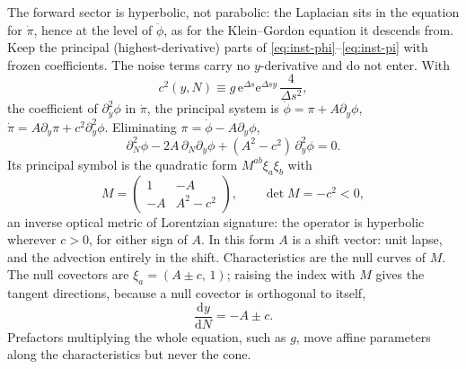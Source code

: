 \documentclass[a4paper,11pt]{article}
\renewcommand{\d}{\mathrm{d}}
\newcommand{\e}[1]{\mathrm{e}^{{#1}}}
\newcommand{\Ny}{N}                          %
\newcommand{\field}{\phi}                    %
\newcommand{\mom}{\pi}                       %
\newcommand{\yco}{y}                         %
\newcommand{\Deltas}{\Delta s}                %
\newcommand{\advcoef}{A}                     %
\newcommand{\wspeed}{c}                       %
\newcommand{\gpref}{g}                        %
\begin{document}
The forward sector is hyperbolic, not parabolic: the Laplacian sits in the
equation for $\dot\mom$, hence at the level of $\ddot\field$, as for the
Klein--Gordon equation it descends from. Keep the principal
(highest-derivative) parts of \eqref{eq:inst-phi}--\eqref{eq:inst-pi} with
frozen coefficients. The noise terms carry no $\yco$-derivative and do not
enter. With
\begin{equation}
    \wspeed^2(\yco,\Ny) \equiv \gpref\,\e{\Deltas}\e{\Deltas\yco}\,\frac{4}{\Deltas^2} ,
    \label{eq:wave-speed}
\end{equation}
the coefficient of $\partial_\yco^2\field$ in $\dot\mom$, the principal
system is $\dot\field=\mom+\advcoef\partial_\yco\field$,
$\dot\mom=\advcoef\partial_\yco\mom+\wspeed^2\partial_\yco^2\field$.
Eliminating $\mom=\dot\field-\advcoef\partial_\yco\field$,
\begin{equation}
    \partial_\Ny^2\field - 2\advcoef\,\partial_\Ny\partial_\yco\field + (\advcoef^2-\wspeed^2)\,\partial_\yco^2\field = 0 .
    \label{eq:hyperbolic-reduction}
\end{equation}
Its principal symbol is the quadratic form $M^{ab}\xi_a\xi_b$ with
\begin{equation}
    M = \begin{pmatrix} 1 & -\advcoef \\ -\advcoef & \advcoef^2-\wspeed^2 \end{pmatrix} ,
    \qquad
    \det M = -\wspeed^2 < 0 ,
    \label{eq:optical-metric}
\end{equation}
an inverse optical metric of Lorentzian signature: the operator is
hyperbolic wherever $\wspeed>0$, for either sign of $\advcoef$. In this
form $\advcoef$ is a shift vector: unit lapse, and the advection
entirely in the shift. Characteristics are the null curves of $M$. The
null covectors are $\xi_a=(\advcoef\pm\wspeed,\,1)$; raising the index with
$M$ gives the tangent directions, because a null covector is orthogonal
to itself,
\begin{equation}
    \frac{\d\yco}{\d\Ny} = -\advcoef \pm \wspeed .
    \label{eq:characteristic-speeds}
\end{equation}
Prefactors multiplying the whole equation, such as $\gpref$, move affine
parameters along the characteristics but never the cone.
\end{document}
